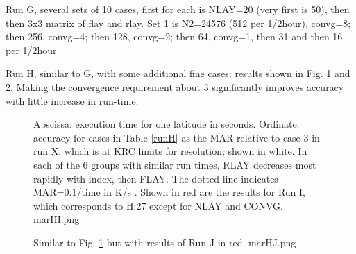 \documentclass{article}
\begin{document}
\clearpage
Run G, several sets of 10 cases, first for each is NLAY=20 (very first is 50),
then then 3x3 matrix of flay and rlay. Set 1 is N2=24576 (512 per 1/2hour),
convg=8; then 256, convg=4; then 128, convg=2; then 64, convg=1, then 31 and
then 16 per 1/2hour

Run H, similar to G, with some additional fine cases; results shown in Fig. \ref{marHI} and  \ref{marHJ}. Making the convergence requirement about 3 significantly improves accuracy with little increase in run-time.

\begin{figure}[!ht] 
\caption[Accuracy versus time]{Abscissa: execution time for one latitude in
  seconds. Ordinate: accuracy for cases in Table \ref{runH} as the MAR relative to case 3 in run X, which is at KRC limits for resolution; shown in white.  In each of the 6 groups with similar run times, RLAY decreases most rapidly with index, then FLAY. The dotted line indicates MAR=0.1/time in K/s . Shown in red are the results for Run I, which corresponds to H:27 except for NLAY and CONVG. 
\label{marHI} marHI.png }
\end{figure} 

\begin{figure}[!ht] 
\caption[Accuracy versus shorter time]{ Similar to Fig. \ref{marHI} but with results of Run J in red.
\label{marHJ} marHJ.png }
\end{figure} 
\end{document}
